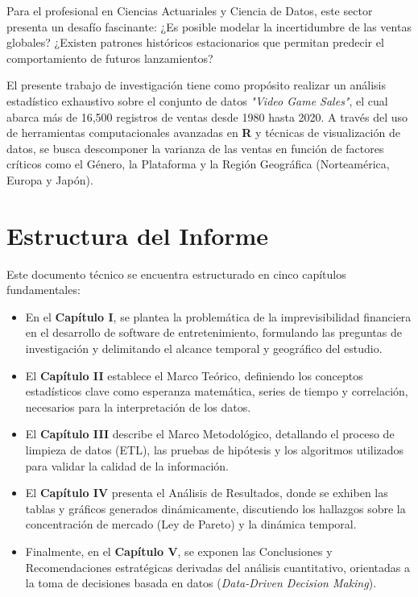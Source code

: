 \documentclass[oneside,11pt]{Latex/Classes/PhDthesisPSnPDF}
\begin{document}
Para el profesional en Ciencias Actuariales y Ciencia de Datos, este
sector presenta un desafío fascinante: ¿Es posible modelar la
incertidumbre de las ventas globales? ¿Existen patrones históricos
estacionarios que permitan predecir el comportamiento de futuros
lanzamientos?

El presente trabajo de investigación tiene como propósito realizar un
análisis estadístico exhaustivo sobre el conjunto de datos
\textit{"Video Game Sales"}, el cual abarca más de 16,500 registros de
ventas desde 1980 hasta 2020. A través del uso de herramientas
computacionales avanzadas en \textbf{R} y técnicas de visualización de
datos, se busca descomponer la varianza de las ventas en función de
factores críticos como el Género, la Plataforma y la Región Geográfica
(Norteamérica, Europa y Japón).

\section*{Estructura del Informe}

Este documento técnico se encuentra estructurado en cinco capítulos
fundamentales:

\begin{itemize}
    \item En el \textbf{Capítulo I}, se plantea la problemática de la imprevisibilidad financiera en el desarrollo de software de entretenimiento, formulando las preguntas de investigación y delimitando el alcance temporal y geográfico del estudio.
    
    \item El \textbf{Capítulo II} establece el Marco Teórico, definiendo los conceptos estadísticos clave como esperanza matemática, series de tiempo y correlación, necesarios para la interpretación de los datos.
    
    \item El \textbf{Capítulo III} describe el Marco Metodológico, detallando el proceso de limpieza de datos (ETL), las pruebas de hipótesis y los algoritmos utilizados para validar la calidad de la información.
    
    \item El \textbf{Capítulo IV} presenta el Análisis de Resultados, donde se exhiben las tablas y gráficos generados dinámicamente, discutiendo los hallazgos sobre la concentración de mercado (Ley de Pareto) y la dinámica temporal.
    
    \item Finalmente, en el \textbf{Capítulo V}, se exponen las Conclusiones y Recomendaciones estratégicas derivadas del análisis cuantitativo, orientadas a la toma de decisiones basada en datos (\textit{Data-Driven Decision Making}).
\end{itemize}
\end{document}
